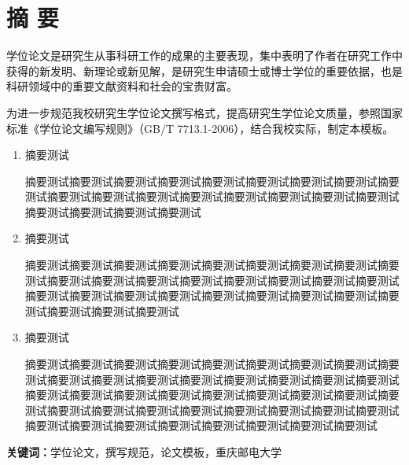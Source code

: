 

	


\chapter{摘 \quad 要}

学位论文是研究生从事科研工作的成果的主要表现，集中表明了作者在研究工作中获得的新发明、新理论或新见解，是研究生申请硕士或博士学位的重要依据，也是科研领域中的重要文献资料和社会的宝贵财富。

为进一步规范我校研究生学位论文撰写格式，提高研究生学位论文质量，参照国家标准《学位论文编写规则》（GB/T 7713.1-2006），结合我校实际，制定本模板。
\begin{enumerate}[leftmargin=0em, wide=0pt, itemindent=2.5em]
	\item 摘要测试
	
	摘要测试摘要测试摘要测试摘要测试摘要测试摘要测试摘要测试摘要测试摘要测试摘要测试摘要测试摘要测试摘要测试摘要测试摘要测试摘要测试摘要测试摘要测试摘要测试摘要测试摘要测试
	
	\item 摘要测试
	
	摘要测试摘要测试摘要测试摘要测试摘要测试摘要测试摘要测试摘要测试摘要测试摘要测试摘要测试摘要测试摘要测试摘要测试摘要测试摘要测试摘要测试摘要测试摘要测试摘要测试摘要测试摘要测试摘要测试摘要测试摘要测试摘要测试摘要测试摘要测试摘要测试
	
	\item 摘要测试
	
	摘要测试摘要测试摘要测试摘要测试摘要测试摘要测试摘要测试摘要测试摘要测试摘要测试摘要测试摘要测试摘要测试摘要测试摘要测试摘要测试摘要测试摘要测试摘要测试摘要测试摘要测试摘要测试摘要测试摘要测试摘要测试摘要测试摘要测试摘要测试摘要测试摘要测试摘要测试摘要测试摘要测试摘要测试摘要测试摘要测试摘要测试摘要测试摘要测试摘要测试摘要测试摘要测试
\end{enumerate}
  
\noindent\songti\textbf{关键词：}学位论文，撰写规范，论文模板，重庆邮电大学

\clearpage